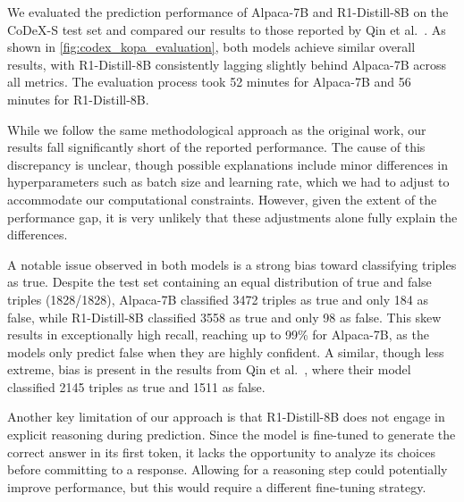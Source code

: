 \documentclass[12pt,a4paper]{article}
\newcommand{\modelalpaca}{Alpaca-7B\xspace}
\newcommand{\modeldeepseek}{R1-Distill-8B\xspace}
\begin{document}
We evaluated the prediction performance of \modelalpaca and \modeldeepseek on the CoDeX-S test set and compared our results to those reported by Qin et al.~\cite{qin2023kopa}.
As shown in \cref{fig:codex_kopa_evaluation}, both models achieve similar overall results, with \modeldeepseek consistently lagging slightly behind \modelalpaca across all metrics.
The evaluation process took 52 minutes for \modelalpaca and 56 minutes for \modeldeepseek.

While we follow the same methodological approach as the original work, our results fall significantly short of the reported performance.
The cause of this discrepancy is unclear, though possible explanations include minor differences in hyperparameters such as batch size and learning rate, which we had to adjust to accommodate our computational constraints.
However, given the extent of the performance gap, it is very unlikely that these adjustments alone fully explain the differences.

A notable issue observed in both models is a strong bias toward classifying triples as true.
Despite the test set containing an equal distribution of true and false triples (1828/1828), \modelalpaca classified 3472 triples as true and only 184 as false, while \modeldeepseek classified 3558 as true and only 98 as false.
This skew results in exceptionally high recall, reaching up to 99\% for \modelalpaca, as the models only predict false when they are highly confident.
A similar, though less extreme, bias is present in the results from Qin et al.~\cite{qin2023kopa}, where their model classified 2145 triples as true and 1511 as false.

Another key limitation of our approach is that \modeldeepseek does not engage in explicit reasoning during prediction.
Since the model is fine-tuned to generate the correct answer in its first token, it lacks the opportunity to analyze its choices before committing to a response.
Allowing for a reasoning step could potentially improve performance, but this would require a different fine-tuning strategy.
\end{document}
